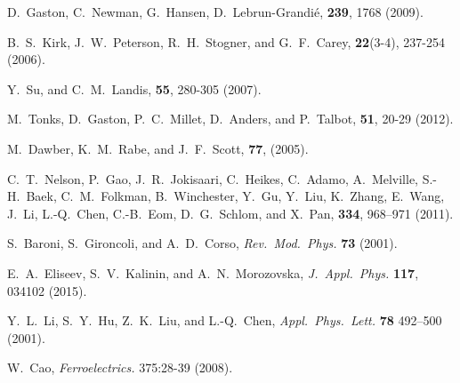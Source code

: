 \documentclass[16pt]{article} %
\begin{document}
\begin{thebibliography}{1}
D.~Gaston, C.~Newman, G.~Hansen, D.~Lebrun-Grandi{\'{e}},
 \textbf{239}, 1768 (2009).

B.~S.~Kirk, J.~W.~Peterson, R.~H.~Stogner, and G.~F.~Carey,
 \textbf{22}(3-4), 237-254 (2006).

Y.~Su, and C.~M.~Landis,
 \textbf{55}, 280-305 (2007).

M.~Tonks, D.~Gaston, P.~C.~Millet, D.~Anders, and P.~Talbot,
 \textbf{51}, 20-29 (2012).

M.~Dawber, K.~M.~Rabe, and J.~F.~Scott,
 \textbf{77}, (2005).

C.~T.~Nelson, P.~Gao, J.~R.~Jokisaari, C.~Heikes, C.~Adamo, A.~Melville, S.-H.~Baek, C.~M.~Folkman, B.~Winchester, Y.~Gu, Y.~Liu, K.~Zhang, 
E.~Wang, J.~Li, L.-Q.~Chen, C.-B.~Eom, D.~G.~Schlom, and X.~Pan,
 \textbf{334}, 968--971 (2011).

S.~Baroni, S.~Gironcoli, and A.~D.~Corso,
\newblock \emph{Rev.~Mod.~Phys.} \textbf{73} (2001).

E.~A.~Eliseev, S.~V.~Kalinin, and A.~N.~Morozovska,
\newblock \emph{J.~Appl.~Phys.} \textbf{117}, 034102 (2015).

Y.~L.~Li, S.~Y.~Hu, Z.~K.~Liu, and L.-Q.~Chen,
\newblock \emph{Appl.~Phys.~Lett.} \textbf{78} 492--500 (2001).

W.~Cao,
\newblock \emph{Ferroelectrics.} 375:28-39 (2008).


\end{thebibliography}
\end{document}
